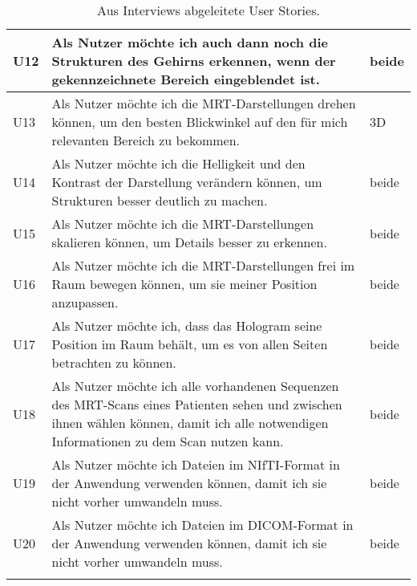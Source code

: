 \begin{longtable}{p{}p{}p{}}
\midrule
U12 & Als Nutzer möchte ich auch dann noch die Strukturen des Gehirns erkennen, wenn der gekennzeichnete Bereich eingeblendet ist. & beide\\
\midrule 
U13 & Als Nutzer möchte ich die MRT-Darstellungen drehen können, um den besten Blickwinkel auf den für mich relevanten Bereich zu bekommen. & 3D\\
\midrule 
U14 & Als Nutzer möchte ich die Helligkeit und den Kontrast der Darstellung verändern können, um Strukturen besser deutlich zu machen. & beide\\
\midrule 
U15 & Als Nutzer möchte ich die MRT-Darstellungen skalieren können, um Details besser zu erkennen. & beide\\
\midrule 
U16 & Als Nutzer möchte ich die MRT-Darstellungen frei im Raum bewegen können, um sie meiner Position anzupassen. & beide\\
\midrule 
U17 & Als Nutzer möchte ich, dass das Hologram seine Position im Raum behält, um es von allen Seiten betrachten zu können. & beide\\
\midrule 
U18 & Als Nutzer möchte ich alle vorhandenen Sequenzen des MRT-Scans eines Patienten sehen und zwischen ihnen wählen können, damit ich alle notwendigen Informationen zu dem Scan nutzen kann. & beide \\
\midrule 
U19 & Als Nutzer möchte ich Dateien im NIfTI-Format in der Anwendung verwenden können, damit ich sie nicht vorher umwandeln muss. & beide\\
\midrule 
U20 & Als Nutzer möchte ich Dateien im DICOM-Format in der Anwendung verwenden können, damit ich sie nicht vorher umwandeln muss. & beide\\

\bottomrule
\caption{\label{tab:userStories}Aus Interviews abgeleitete User Stories.}
\end{longtable}

